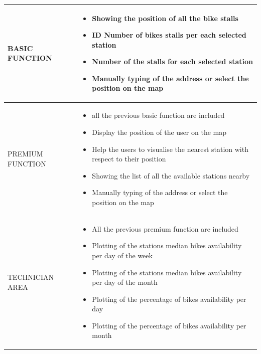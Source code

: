 \documentclass{article}
\begin{document}
\begin{table} [H]
    \begin{center}
        \begin{tabular}{|l|p{}|}
            \hline
            BASIC FUNCTION &   \begin{itemize}
                               \item Showing the position of all the bike stalls
                               \item ID Number of bikes stalls per each selected station
                               \item Number of the stalls for each selected station
                               \item Manually typing of the address or select the position on the map  
                               \end{itemize}
        \\
            \hline
            PREMIUM FUNCTION &  \begin{itemize}
                                \item all the previous basic function    are included
                                \item Display the position of the user on the map
                                \item Help the users to visualise the nearest station with respect to their position
                                \item Showing the list of all the available  stations nearby
                                \item Manually typing of the address or select the position on the map  
                                \end{itemize}
             \\
            \hline
            TECHNICIAN AREA &  \begin{itemize}
                               \item All the previous premium function    are included
                               \item Plotting of the stations median bikes availability per day of the week
                               \item Plotting of the stations median bikes availability per day of the month
                               \item Plotting of the percentage of bikes availability per day
                               \item Plotting of the percentage of bikes availability per month

\end{itemize}
\end{tabular}
\end{center}
\end{table}
\end{document}
